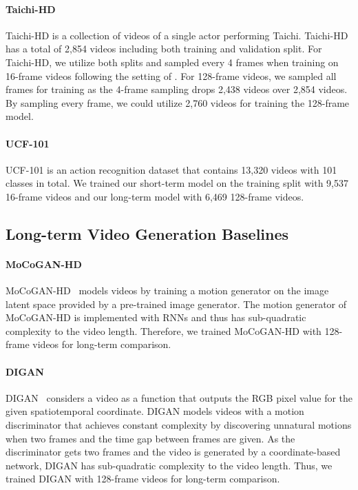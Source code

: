 \documentclass[10pt,twocolumn,letterpaper]{article}
\begin{document}
\paragraph{Taichi-HD} Taichi-HD is a collection of videos of a single actor performing Taichi. Taichi-HD has a total of 2,854 videos including both training and validation split. For Taichi-HD, we utilize both splits and sampled every 4 frames when training on 16-frame videos following the setting of \cite{TATS, DIGAN}. For 128-frame videos, we sampled all frames for training as the 4-frame sampling drops 2,438 videos over 2,854 videos. By sampling every frame, we could utilize 2,760 videos for training the 128-frame model.

\paragraph{UCF-101} UCF-101 is an action recognition dataset that contains 13,320 videos with 101 classes in total. We trained our short-term model on the training split with 9,537 16-frame videos and our long-term model with 6,469 128-frame videos.

\subsection{Long-term Video Generation Baselines}
\label{appx:baselines}
\paragraph{MoCoGAN-HD} MoCoGAN-HD~\cite{MoCoGAN-HD} models videos by training a motion generator on the image latent space provided by a pre-trained image generator. The motion generator of MoCoGAN-HD is implemented with RNNs and thus has sub-quadratic complexity to the video length. Therefore, we trained MoCoGAN-HD with 128-frame videos for long-term comparison.

\paragraph{DIGAN}
DIGAN~\cite{DIGAN} considers a video as a function that outputs the RGB pixel value for the given spatiotemporal coordinate. DIGAN models videos with a motion discriminator that achieves constant complexity by discovering unnatural motions when two frames and the time gap between frames are given. As the discriminator gets two frames and the video is generated by a coordinate-based network, DIGAN has sub-quadratic complexity to the video length. Thus, we trained DIGAN with 128-frame videos for long-term comparison.
\end{document}
